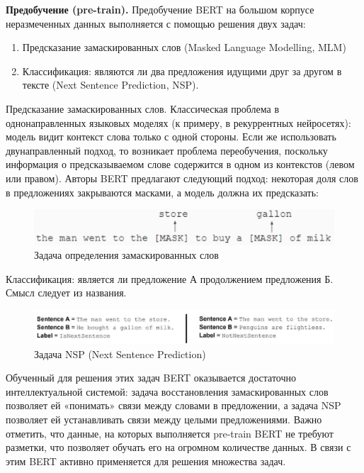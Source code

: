 \documentclass[12pt,a4paper]{article}
\begin{document}
\textbf{Предобучение (pre-train).} Предобучение BERT на большом корпусе неразмеченных данных выполняется с помощью решения двух задач:
\begin{enumerate}
    \item Предсказание замаскированных слов (Masked Language Modelling, MLM)
    \item Классификация: являются ли два предложения идущими друг за другом в тексте (Next Sentence Prediction, NSP).
\end{enumerate}

\noindent Предсказание замаскированных слов. Классическая проблема в однонаправленных языковых моделях (к примеру, в рекуррентных нейросетях): модель видит контекст слова только с одной стороны. Если же использовать двунаправленный подход, то возникает проблема переобучения, поскольку информация о предсказываемом слове содержится в одном из контекстов (левом или правом). Авторы BERT предлагают следующий подход: некоторая доля слов в предложениях закрываются масками, а модель должна их предсказать:

\begin{figure}[H]
	\begin{center}
		\includegraphics[scale=0.4]{masked.png}
	\end{center}
	\caption{Задача определения замаскированных слов}
\end{figure}


\noindent Классификация: является ли предложение А продолжением предложения Б. Смысл следует из названия.  
\begin{figure}[H]
	\begin{center}
		\includegraphics[scale=0.5]{nsp.png}
	\end{center}
	\caption{Задача NSP (Next Sentence Prediction)}
\end{figure}

\noindent Обученный для решения этих задач BERT оказывается достаточно интеллектуальной системой: задача восстановления замаскированных слов позволяет ей «понимать» связи между словами в предложении, а задача NSP позволяет ей устанавливать связи между целыми предложениями. Важно отметить, что данные, на которых выполняется pre-train BERT не требуют разметки, что позволяет обучать его на огромном количестве данных. В связи с этим BERT активно применяется для решения множества задач.\\
\end{document}
